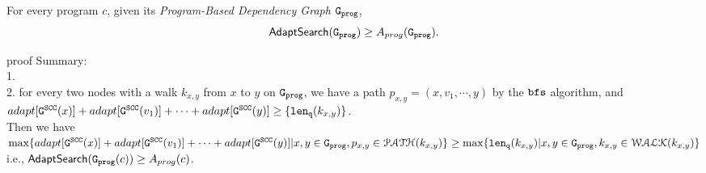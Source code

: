 \begin{thm}
  \label{thm:sound_adaptalg}
  For every program $c$, given its \emph{Program-Based Dependency Graph} $\mathtt{{G_{prog}}}$,
   $$\mathsf{AdaptSearch}(\mathtt{{G_{prog}}}) \geq A_{{prog}}(\mathtt{{G_{prog}}}).$$
\end{thm}
proof Summary:
\\
1. 
\\
2. for every two nodes with a walk $k_{x,y}$ from $x$ to $y$ on $\mathtt{{G_{prog}}}$, we have a path
 $p_{x,y} = (x, v_1, \cdots, y)$ by the $\mathtt{bfs}$ algorithm,
and $adapt[\mathtt{G^{SCC}}(x)] + adapt[\mathtt{G^{SCC}}(v_1)] + \cdots + adapt[\mathtt{G^{SCC}}(y)] \geq \{\mathtt{len}_{\tt q}(k_{x,y})\}$.
\\
Then we have
$\max\{adapt[\mathtt{G^{SCC}}(x)] + adapt[\mathtt{G^{SCC}}(v_1)] + \cdots + adapt[\mathtt{G^{SCC}}(y)] | x, y \in \mathtt{{G_{prog}}}, p_{x,y} \in \mathcal{PATH}(k_{x,y}) \}
\geq \max\{\mathtt{len}_{\tt q}(k_{x,y}) | x, y \in \mathtt{{G_{prog}}}, k_{x,y} \in \mathcal{WALK}(k_{x,y})\}$
\\
i.e., 
$\mathsf{AdaptSearch}(\mathtt{{G_{prog}}}(c)) \geq A_{{prog}}(c)$.
